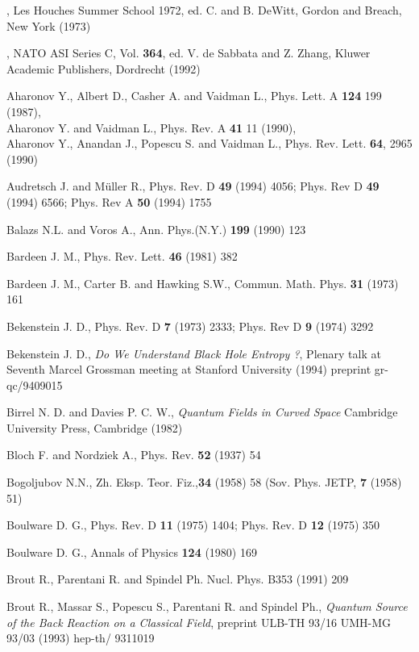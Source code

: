 \documentclass[12pt,oneside]{report}
\begin{document}
\begin{thebibliography}{999}


, Les Houches Summer School 1972, ed. C. and
B. DeWitt, Gordon and Breach, New York (1973)

, NATO ASI Series C, Vol. {\bf 364}, ed. V. de
Sabbata and Z. Zhang, Kluwer Academic Publishers, Dordrecht (1992)

 Aharonov Y., Albert D.,  Casher A. and Vaidman L., Phys. Lett.
A {\bf 124} 199 (1987),\\  
Aharonov Y. and Vaidman  L.,  Phys. Rev. A {\bf 41} 11 (1990),\\
Aharonov Y., Anandan  J.,  Popescu S. and Vaidman  L.,
     Phys. Rev. Lett. {\bf 64}, 2965 (1990)

Audretsch J. and M\"uller R., Phys. Rev. D {\bf 49} (1994)
 4056; Phys. Rev D {\bf 49} (1994) 6566; 
Phys. Rev A {\bf 50} (1994) 1755

Balazs N.L. and Voros A., Ann. Phys.(N.Y.) {\bf 199} (1990)
123

 Bardeen J. M., Phys. Rev. Lett. {\bf 46} (1981) 382

Bardeen J. M., Carter B. and Hawking S.W., Commun. Math. Phys. {\bf 31}
(1973) 161

 Bekenstein J. D., Phys. Rev. D {\bf7} (1973) 2333; Phys. Rev D {\bf
9} (1974) 3292 

 Bekenstein J. D.,  {\em Do We Understand Black Hole Entropy ?}, Plenary talk
at Seventh Marcel Grossman meeting at Stanford University
(1994) preprint gr-qc/9409015

Birrel N. D. and Davies P. C. W., {\em Quantum Fields in 
Curved Space} Cambridge University Press, Cambridge (1982)

Bloch F. and Nordziek A., Phys. Rev. {\bf 52} (1937) 54

Bogoljubov N.N., Zh. Eksp. Teor. Fiz.,{\bf  34} (1958) 58 (Sov. Phys.
JETP, {\bf 7 }(1958) 51)

Boulware D. G., Phys. Rev. D {\bf 11} (1975) 1404; Phys. Rev. D {\bf
12} (1975) 350

Boulware D. G., Annals of Physics {\bf 124} (1980) 169

 Brout R.,  Parentani R. and Spindel Ph. Nucl. Phys. B353 (1991) 209

Brout R., Massar S., Popescu S., Parentani R. and Spindel Ph., {\em
Quantum Source of the Back Reaction on a Classical Field}, preprint 
ULB-TH 93/16 UMH-MG
93/03 (1993) hep-th/ 9311019


\end{thebibliography}
\end{document}
